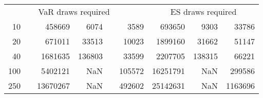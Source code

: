 {{\begin{longtable}{rr rrr r rrr}
\hline 
 && \multicolumn{3}{c}{VaR draws required} &&   \multicolumn{3}{c}{ES draws required} \\  \cline{3-5}  \cline{7-9} 
10 & & 458669 & 6074 & & 3589 & 693650 & 9303 & 33786 \\ 
20 & & 671011 & 33513 & & 10023 & 1899160 & 31662 & 51147 \\ 
40 & & 1681635 & 136803 & & 33599 & 2207705 & 138315 & 66221 \\ 
100 & & 5402121 & NaN & & 105572 & 16251791 & NaN & 299586 \\ 
250 & & 13670267 & NaN & & 492602 & 25142631 & NaN & 1163696 \\ 
\hline 
\end{longtable} 
} 
} 
